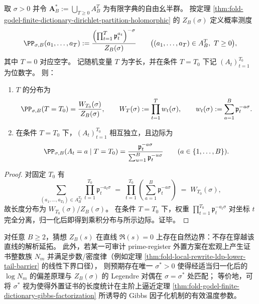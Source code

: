 \begin{theorem}\label{thm:fold-godel-finite-dictionary-gibbs-factorization}
取 \(\sigma>0\) 并令 \(\mathbf A_B^{\ast}:=\bigcup_{T\ge 0}A_B^{T}\) 为有限字典的自由幺半群。
按定理 \ref{thm:fold-godel-finite-dictionary-dirichlet-partition-holomorphic} 的 \(Z_B(\sigma)\) 定义概率测度
\[
\PP_{\sigma,B}(a_1,\dots,a_T)
:=
\frac{\left(\prod_{t=1}^{T}\mathfrak p_t^{a_t}\right)^{-\sigma}}{Z_B(\sigma)}
\qquad\bigl((a_1,\dots,a_T)\in A_B^T,\ T\ge 0\bigr),
\]
其中 \(T=0\) 对应空字。
记随机变量 \(T\) 为字长，并在条件 \(T=T_0\) 下记 \((A_t)_{t=1}^{T_0}\) 为位数字。
则：
\begin{enumerate}
  \item \(T\) 的分布为
  \[
  \PP_{\sigma,B}(T=T_0)=\frac{W_{T_0}(\sigma)}{Z_B(\sigma)},
  \qquad
  W_T(\sigma):=\prod_{t=1}^{T} w_t(\sigma),
  \qquad
  w_t(\sigma):=\sum_{a=1}^{B}\mathfrak p_t^{-a\sigma}.
  \]
  \item 在条件 \(T=T_0\) 下，\((A_t)_{t=1}^{T_0}\) 相互独立，且边际为
  \[
  \PP_{\sigma,B}(A_t=a\mid T=T_0)
  =
  \frac{\mathfrak p_t^{-a\sigma}}{\sum_{u=1}^{B}\mathfrak p_t^{-u\sigma}}
  \qquad (a\in\{1,\dots,B\}).
  \]
\end{enumerate}
\end{theorem}
\begin{proof}
对固定 \(T_0\) 有
\[
\sum_{(a_1,\dots,a_{T_0})\in A_B^{T_0}}\prod_{t=1}^{T_0}\mathfrak p_t^{-a_t\sigma}
\;=\;
\prod_{t=1}^{T_0}\left(\sum_{a=1}^{B}\mathfrak p_t^{-a\sigma}\right)
\;=\;
W_{T_0}(\sigma),
\]
故长度分布为 \(W_{T_0}(\sigma)/Z_B(\sigma)\)。
在条件 \(T=T_0\) 下，权重 \(\prod_{t=1}^{T_0}\mathfrak p_t^{-a_t\sigma}\) 对坐标 \(t\) 完全分离，归一化后即得到乘积分布与所示边际。证毕。
\end{proof}

\begin{conjecture}\label{conj:fold-godel-finite-dictionary-natural-boundary-temperature-match}
对任意 \(B\ge 2\)，猜想 \(Z_B(s)\) 在直线 \(\Re(s)=0\) 上存在自然边界：不存在穿越该直线的解析延拓。
此外，若某一可审计 prime-register 外置方案在宏观上产生证书整数族 \(N_m\) 并满足步数/密度律（例如定理 \ref{thm:fold-local-rewrite-ldp-lower-tail-barrier} 的线性下界口径），
则预期存在唯一 \(\sigma^\ast>0\) 使得经适当归一化后的 \(\log N_m\) 的偏差原理与 \(Z_B(\sigma)\) 的 Legendre 对偶在 \(\sigma=\sigma^\ast\) 处匹配；
等价地，可将 \(\sigma^\ast\) 视为使得外置证书的长度统计在主阶上逼近定理 \ref{thm:fold-godel-finite-dictionary-gibbs-factorization} 所诱导的 Gibbs 因子化机制的有效温度参数。
\end{conjecture}

